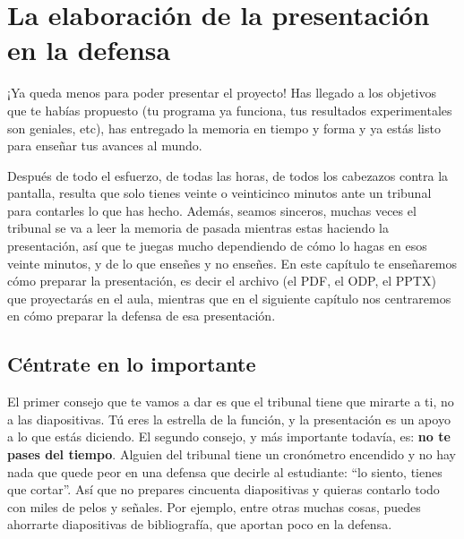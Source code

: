 \chapter{La elaboración de la presentación en la defensa} \label{cap:elaboraciónPresentación}


¡Ya queda menos para poder presentar el proyecto! Has llegado a los objetivos que te habías propuesto (tu programa ya funciona, tus resultados experimentales son geniales, etc), has entregado la memoria en tiempo y forma y ya estás listo para enseñar tus avances al mundo.

Después de todo el esfuerzo, de todas las horas, de todos los cabezazos contra la pantalla, resulta que solo tienes veinte o veinticinco minutos ante un tribunal para contarles lo que has hecho. Además, seamos sinceros, muchas veces el tribunal se va a leer la memoria de pasada mientras estas haciendo la presentación, así que te juegas mucho dependiendo de cómo lo hagas en esos veinte minutos, y de lo que enseñes y no enseñes. En este capítulo te enseñaremos cómo preparar la presentación, es decir el archivo (el PDF, el ODP, el PPTX) que proyectarás en el aula, mientras que en el siguiente capítulo nos centraremos en cómo preparar la defensa de esa presentación.

\section{Céntrate en lo importante}

El primer consejo que te vamos a dar es que el tribunal tiene que mirarte a ti, no a las diapositivas. Tú eres la estrella de la función, y la presentación es un apoyo a lo que estás diciendo. El segundo consejo, y más importante todavía, es: \textbf{no te pases del tiempo}. Alguien del tribunal tiene un cronómetro encendido y no hay nada que quede peor en una defensa que decirle al estudiante: ``lo siento, tienes que cortar''. Así que no prepares cincuenta diapositivas y quieras contarlo todo con miles de pelos y señales. Por ejemplo, entre otras muchas cosas, puedes ahorrarte diapositivas de bibliografía, que aportan poco en la defensa.

